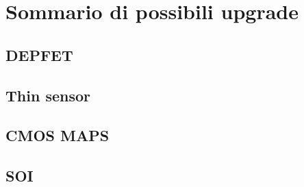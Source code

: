 


\section{Sommario di possibili upgrade}

\subsection{DEPFET}

\subsection{Thin sensor}

\subsection{CMOS MAPS}

\subsection{SOI}